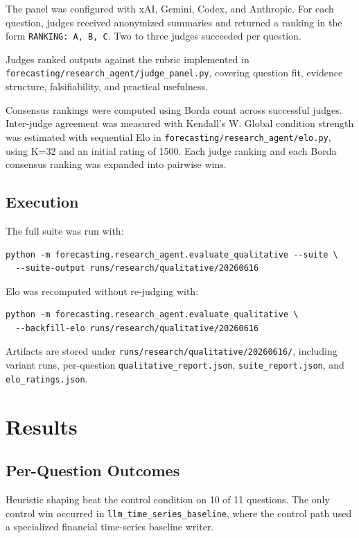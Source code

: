 \documentclass[11pt]{article}
\begin{document}
The panel was configured with xAI, Gemini, Codex, and Anthropic. For each
question, judges received anonymized summaries and returned a ranking in the
form \texttt{RANKING: A, B, C}. Two to three judges succeeded per question.

Judges ranked outputs against the rubric implemented in
\texttt{forecasting/research\_agent/judge\_panel.py}, covering question fit,
evidence structure, falsifiability, and practical usefulness.

Consensus rankings were computed using Borda count across successful judges.
Inter-judge agreement was measured with Kendall's W. Global condition strength
was estimated with sequential Elo in \texttt{forecasting/research\_agent/elo.py},
using K=32 and an initial rating of 1500. Each judge ranking and each Borda
consensus ranking was expanded into pairwise wins.

\subsection{Execution}

The full suite was run with:

\begin{verbatim}
python -m forecasting.research_agent.evaluate_qualitative --suite \
  --suite-output runs/research/qualitative/20260616
\end{verbatim}

Elo was recomputed without re-judging with:

\begin{verbatim}
python -m forecasting.research_agent.evaluate_qualitative \
  --backfill-elo runs/research/qualitative/20260616
\end{verbatim}

Artifacts are stored under \texttt{runs/research/qualitative/20260616/},
including variant runs, per-question \texttt{qualitative\_report.json},
\texttt{suite\_report.json}, and \texttt{elo\_ratings.json}.

\section{Results}

\subsection{Per-Question Outcomes}

Heuristic shaping beat the control condition on 10 of 11 questions. The only
control win occurred in \texttt{llm\_time\_series\_baseline}, where the control
path used a specialized financial time-series baseline writer.
\end{document}
